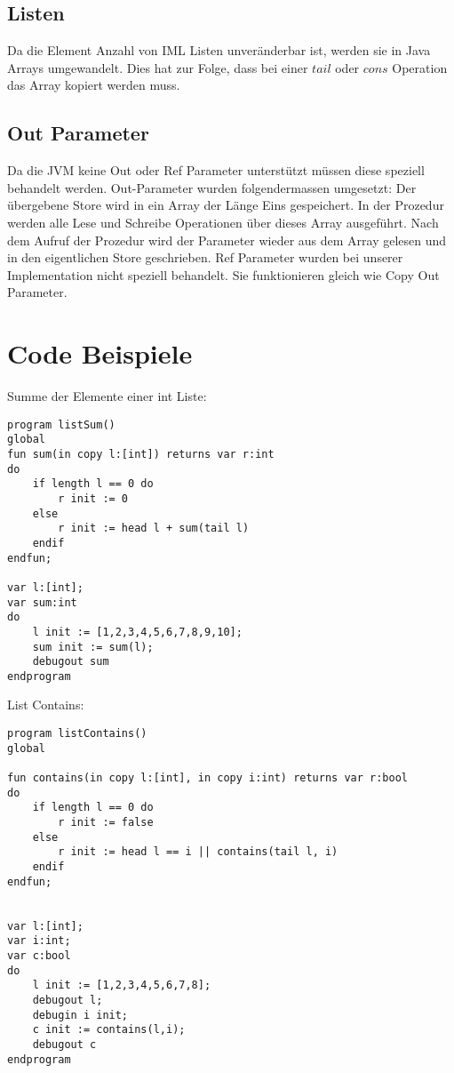 \documentclass[a4paper,notitlepage,oneside]{article}
\begin{document}
\subsection{Listen}
Da die Element Anzahl von IML Listen unveränderbar ist, werden sie in Java Arrays umgewandelt.
Dies hat zur Folge, dass bei einer $tail$ oder $cons$ Operation das Array kopiert werden muss.

\subsection{Out Parameter}
Da die JVM keine Out oder Ref Parameter unterstützt müssen diese speziell behandelt werden. Out-Parameter wurden folgendermassen umgesetzt: Der übergebene Store wird in ein Array der Länge Eins gespeichert. In der Prozedur werden alle Lese und Schreibe Operationen über dieses Array ausgeführt. Nach dem Aufruf der Prozedur wird der Parameter wieder aus dem Array gelesen und in den eigentlichen Store geschrieben. Ref Parameter wurden bei unserer Implementation nicht speziell behandelt. Sie funktionieren gleich wie Copy Out Parameter.


\newpage
\section{Code Beispiele}
Summe der Elemente einer int Liste:
\begin{lstlisting}[language=iml, caption=Beispiel für die Berechnung der Summe der Element einer Liste in IML]
program listSum()
global
fun sum(in copy l:[int]) returns var r:int
do
	if length l == 0 do
		r init := 0
	else
		r init := head l + sum(tail l)
	endif
endfun;

var l:[int];
var sum:int
do
	l init := [1,2,3,4,5,6,7,8,9,10];
	sum init := sum(l);
	debugout sum
endprogram
\end{lstlisting}

List Contains:
\begin{lstlisting}[language=iml, caption=Listen Contains]
program listContains()
global

fun contains(in copy l:[int], in copy i:int) returns var r:bool
do
	if length l == 0 do
		r init := false
	else
		r init := head l == i || contains(tail l, i)
	endif
endfun;


var l:[int];
var i:int;
var c:bool
do
	l init := [1,2,3,4,5,6,7,8];
	debugout l;
	debugin i init;
	c init := contains(l,i);
	debugout c
endprogram

\end{lstlisting}
\end{document}
